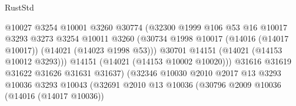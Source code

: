 \begin{lexlean}{RustStd}
\begin{coremodule}
                                            @10027
                                            @3254
                                            @10001
                                            @3260
                                            @30774
                                            (@32300
                                              @1999
                                              @106
                                              @53
                                              @16
                                              @10017
                                              @3293
                                              @3273
                                              @3254
                                              @10011
                                              @3260
                                              (@30734
                                                @1998
                                                @10017
                                                (@14016 (@14017 @10017))
                                                (@14021 (@14023 @1998 @53)))
                                              @30701
                                              @14151
                                              (@14021 (@14153 @10012 @3293)))
                                            @14151
                                            (@14021 (@14153 @10002 @10020)))
                                          @31616
                                          @31619
                                          @31622
                                          @31626
                                          @31631
                                          @31637)
                                        (@32346
                                          @10030
                                          @2010
                                          @2017
                                          @13
                                          @3293
                                          @10036
                                          @3293
                                          @10043
                                          (@32691
                                            @2010
                                            @13
                                            @10036
                                            (@30796
                                              @2009
                                              @10036
                                              (@14016 (@14017 @10036))

\end{coremodule}
\end{lexlean}
